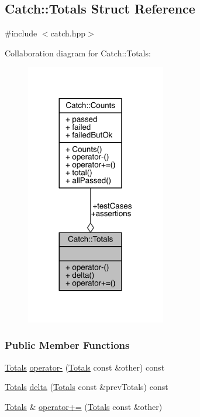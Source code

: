 \hypertarget{a00089}{}\subsection{Catch\+:\+:Totals Struct Reference}
\label{a00089}


{\ttfamily \#include $<$catch.\+hpp$>$}



Collaboration diagram for Catch\+:\+:Totals\+:\nopagebreak
\begin{figure}[H]
\begin{center}
\leavevmode
\includegraphics[width=173pt]{a00292}
\end{center}
\end{figure}
\subsubsection*{Public Member Functions}
\begin{DoxyCompactItemize}
\item 
\hyperlink{a00089}{Totals} \hyperlink{a00089_abe15cd8a82ba9a4868dd7a542add827c}{operator-\/} (\hyperlink{a00089}{Totals} const \&other) const 
\item 
\hyperlink{a00089}{Totals} \hyperlink{a00089_a3dee0f599c081a8360c0112fb1dafe8f}{delta} (\hyperlink{a00089}{Totals} const \&prev\+Totals) const 
\item 
\hyperlink{a00089}{Totals} \& \hyperlink{a00089_a574015076e54cc405c70b053e3356e43}{operator+=} (\hyperlink{a00089}{Totals} const \&other)
\end{DoxyCompactItemize}
